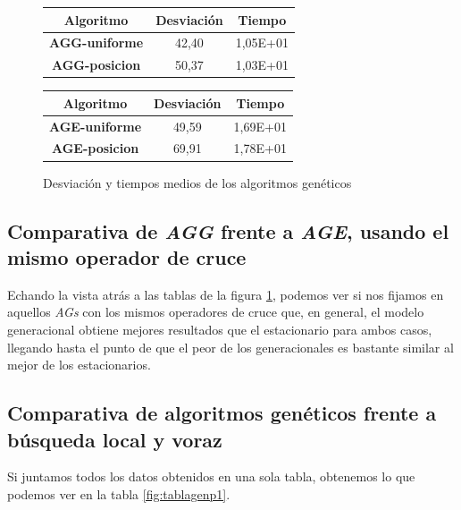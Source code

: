 \begin{figure}[H]
    \begin{minipage}[c]{0.49\textwidth}
	    \begin{tabular}{|c|c|c|}
	        \hline
	        Algoritmo & \textbf{Desviación} & \textbf{Tiempo}\\
	        \hline
	        \textbf{AGG-uniforme} & 42,40 & 1,05E+01\\
	        \hline
	        \textbf{AGG-posicion} & 50,37 & 1,03E+01\\
	        \hline
	    \end{tabular}
	\end{minipage}
	\begin{minipage}[c]{0.49\textwidth}
	    \begin{tabular}{|c|c|c|}
	        \hline
	        Algoritmo & \textbf{Desviación} & \textbf{Tiempo}\\
	        \hline
	        \textbf{AGE-uniforme} & 49,59 & 1,69E+01\\
	        \hline
	        \textbf{AGE-posicion} & 69,91 & 1,78E+01\\
	        \hline
	    \end{tabular}
	\end{minipage}
	\caption{Desviación y tiempos medios de los algoritmos genéticos}
	\label{fig:dispYTmediosGen}
\end{figure}


\subsection{Comparativa de \textit{AGG} frente a \textit{AGE}, usando el mismo operador de cruce}

Echando la vista atrás a las tablas de la figura \ref{fig:dispYTmediosGen}, podemos ver si nos fijamos en aquellos \textit{AGs} con los mismos operadores de cruce que, en general, el modelo generacional obtiene mejores resultados que el estacionario para ambos casos, llegando hasta el punto de que el peor de los generacionales es bastante similar al mejor de los estacionarios.

\newpage

\subsection{Comparativa de algoritmos genéticos frente a búsqueda local y voraz}

Si juntamos todos los datos obtenidos en una sola tabla, obtenemos lo que podemos ver en la tabla \ref{fig:tablagenp1}.

